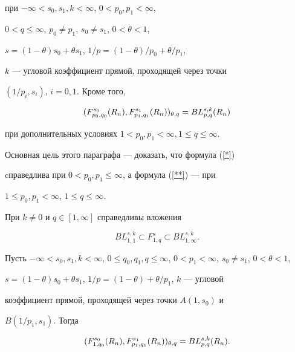 при $-\infty<s_0,s_1,k<\infty$, $0<p_0,p_1<\infty$,


$0<q\le \infty$, $p_0\ne p_1$, $s_0\ne s_1$, $0<\theta <1$,


$s=(1-\theta)s_0+\theta s_1$, $1/p=(1-\theta)/p_0+\theta/p_1$,


$k$ --- угловой коэффициент прямой, проходящей через точки


$(1/p_i,s_i)$, $i=0, 1$. Кроме того,


\begin{equation}


\label{**}


(F^{s_0}_{p_0,q_0}(R_n),F^{s_1}_{p_1,q_1}(R_n))_{\theta,q}=B\Li(R_n)


\end{equation}


при дополнительных условиях $1<p_0,p_1< \infty, 1\le q\le\infty$.


 


Основная цель этого параграфа --- доказать, что формула (\ref{*})


cправедлива при $0<p_0,p_1\le \infty$, а формула (\ref{**}) --- при


$1\le p_0,p_1<\infty$, $1\le q\le \infty$.


 


\begin{lemnonum} При $k\ne 0$ и $q\in [1,\infty ]$ справедливы вложения


$$


BL^{s,k}_{1,1}\subset F^s_{1,q}\subset BL^{s,k}_{1,\infty}.


$$


\end{lemnonum}


 


\begin{cornonum} Пусть $-\infty<s_0,s_1,k<\infty$, $0\le q_0,q_1,q\le


\infty$, $0<p_1<\infty$, $s_0\ne s_1$, $0<\theta <1$,


$s=(1-\theta)s_0+\theta s_1$, $1/p=(1-\theta)+\theta/p_1$, $k$ --- угловой


коэффициент прямой, проходящей через точки $A(1,s_0)$ и


$B(1/p_1,s_1)$. Тогда


$$


(F^{s_0}_{1,q_0}(R_n),F^{s_1}_{p_1,q_1}(R_n))_{\theta,q}=B\Li(R_n).


$$


\end{cornonum}





